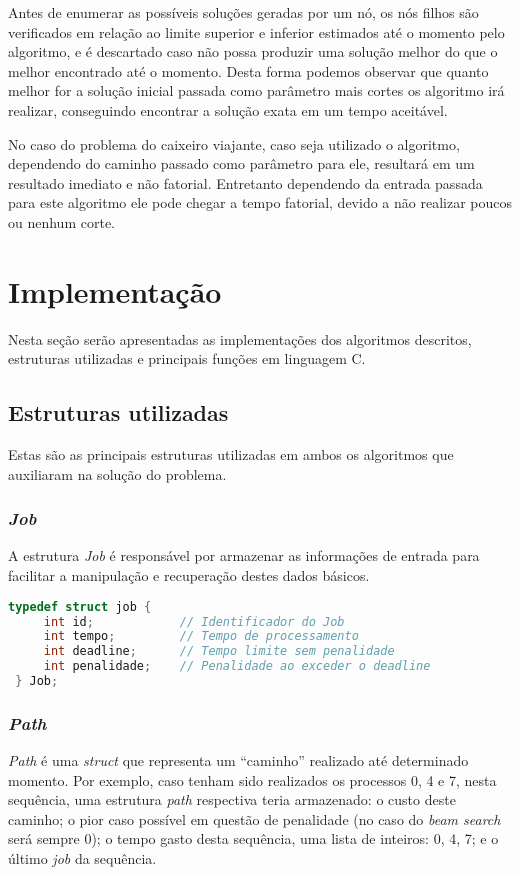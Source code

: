 \documentclass[
	11pt,				%
	oneside,			%
	a4paper,			%
	english,			%
	brazil,				%
	]{article}
\begin{document}
Antes de enumerar as possíveis soluções geradas por um nó, os nós filhos são verificados em relação ao limite superior e inferior estimados até o momento pelo algoritmo, e é descartado caso não possa produzir uma solução melhor do que o melhor encontrado até o momento. Desta forma podemos observar que quanto melhor for a solução inicial passada como parâmetro mais cortes os algoritmo irá realizar, conseguindo encontrar a solução exata em um tempo aceitável.

No caso do problema do caixeiro viajante, caso seja utilizado o algoritmo, dependendo do caminho passado como parâmetro para ele, resultará em um resultado imediato e não fatorial. Entretanto dependendo da entrada passada para este algoritmo ele pode chegar a tempo fatorial, devido a não realizar poucos ou nenhum corte.

\section{Implementação}
Nesta seção serão apresentadas as implementações dos algoritmos descritos, estruturas utilizadas e principais funções em linguagem C.

\subsection{Estruturas utilizadas}
Estas são as principais estruturas utilizadas em ambos os algoritmos que auxiliaram na solução do problema.

\subsubsection{\textit{Job}}
A estrutura \textit{Job} é responsável por armazenar as informações de entrada para facilitar a manipulação e recuperação destes dados básicos.

\begin{lstlisting}[language=C, caption=Estrutura \textit{Job}]
 typedef struct job {
     int id;            // Identificador do Job
     int tempo;         // Tempo de processamento
     int deadline;      // Tempo limite sem penalidade
     int penalidade;    // Penalidade ao exceder o deadline
 } Job;
\end{lstlisting}

\subsubsection{\textit{Path}}
\textit{Path} é uma \textit{struct} que representa um ``caminho'' realizado até determinado momento. Por exemplo, caso tenham sido realizados os processos 0, 4 e 7, nesta sequência, uma estrutura \textit{path} respectiva teria armazenado: o custo deste caminho; o pior caso possível em questão de penalidade (no caso do \textit{beam search} será sempre 0); o tempo gasto desta sequência, uma lista de inteiros: 0, 4, 7; e o último \textit{job} da sequência.
\end{document}
